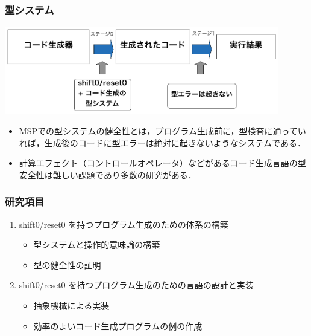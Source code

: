 \documentclass[dvipdfmx,cjk,xcolor=dvipsnames,envcountsect,notheorems,12pt]{beamer}
\theoremstyle{definition}
\begin{document}
\begin{frame}
  \frametitle{型システム}

  \includegraphics[clip,width=12cm]{./img/type_system1.png}


  \begin{itemize}
  \item MSPでの型システムの健全性とは，プログラム生成前に，型検査に通っていれば，生成後のコードに型エラーは絶対に起きないようなシステムである．
  \item 計算エフェクト（コントロールオペレータ）などがあるコード生成言語の型安全性は難しい課題であり多数の研究がある．
  \end{itemize}


\end{frame}


\begin{frame}[fragile]
  \frametitle{研究項目}
\begin{enumerate}
\item shift0/reset0 を持つプログラム生成のための体系の構築
  \begin{itemize}
  \item 型システムと操作的意味論の構築
  \item 型の健全性の証明
  \end{itemize}
\item shift0/reset0 を持つプログラム生成のための言語の設計と実装
  \begin{itemize}
  \item 抽象機械による実装
  \item 効率のよいコード生成プログラムの例の作成
  \end{itemize}
\end{enumerate}

\end{frame}
\end{document}

